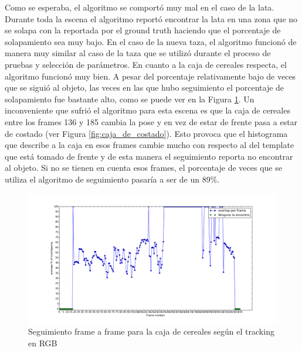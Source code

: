 Como se esperaba, el algoritmo se comportó muy mal en el caso de la lata. Durante toda la escena el algoritmo reportó encontrar la lata en una zona que no se solapa con la reportada por el ground truth haciendo que el porcentaje de solapamiento sea muy bajo. En el caso de la nueva taza, el algoritmo funcionó de manera muy similar al caso de la taza que se utilizó durante el proceso de pruebas y selección de parámetros. En cuanto a la caja de cereales respecta, el algoritmo funcionó muy bien. A pesar del porcentaje relativamente bajo de veces que se siguió al objeto, las veces en las que hubo seguimiento el porcentaje de solapamiento fue bastante alto, como se puede ver en la Figura \ref{frame_frame_rgb_nuevo}. Un inconveniente que sufrió el algoritmo para esta escena es que la caja de cereales entre los frames 136 y 185 cambia la pose y en vez de estar de frente pasa a estar de costado (ver Figura \ref{fig:caja_de_costado}). Esto provoca que el histograma que describe a la caja en esos frames cambie mucho con respecto al del template que está tomado de frente y de esta manera el seguimiento reporta no encontrar al objeto. Si no se tienen en cuenta esos frames, el porcentaje de veces que se utiliza el algoritmo de seguimiento pasaría a ser de un 89\%.

\begin{figure}
	\centering
	\includegraphics[width=\textwidth]{img/frame_a_frame/rgb-caja.png}
	\caption{Seguimiento frame a frame para la caja de cereales según el tracking en RGB}
	\label{frame_frame_rgb_nuevo}
\end{figure}



